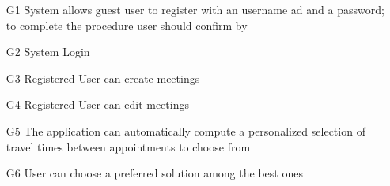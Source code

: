 \begin{enumerate}
	\item
		[G1] System allows guest user to register with an username ad and a password; to complete the procedure user should confirm by 

	\item
		[G2] System Login

	\item 
		[G3] Registered User can create meetings 
	\item 
		[G4] Registered User can edit meetings
	\item 
		[G5] The application can automatically compute a personalized selection of travel times between appointments to choose from
	\item
		[G6] User can choose a preferred solution among the best ones


\end{enumerate}	
